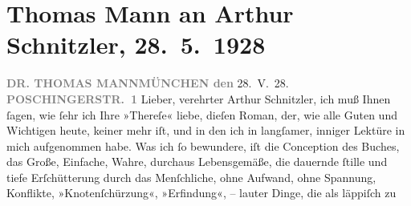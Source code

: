 

         \renewcommand{\erwaehnteOrte}{Orte: München, Poschingerstraße, Wien}
         \renewcommand{\erwaehnteWerke}{Werke: Therese. Chronik eines Frauenlebens}
               \section[Thomas Mann an Arthur Schnitzler, 28. 5. 1928]{ Thomas Mann an Arthur Schnitzler, 28. 5. 1928}\nopagebreak{}\rehead{ }\begin{ledgroupsized}[t]{13cm}\normalsize\beginnumbering \toendnotes[C]{\smallbreak\pagebreak[2]} 
\toendnotes[C]{\smallbreak}\pstart
           \noindent{}{\pb}\textcolor{gray}{\textbf{DR. THOMAS MANN}}\hfill \textcolor{gray}{\textbf{MÜNCHEN den}}{ }28. V. 28.\pend
           \pstart
           \raggedleft{}\textcolor{gray}{\textbf{POSCHINGERSTR. 1}}\pend
           \pstart{}Lieber, verehrter Arthur Schnitzler,\pend\pstart
           ich muß Ihnen ſagen, wie ſehr ich Ihre »Thereſe«
               liebe, dieſen Roman, der, wie alle Guten und Wichtigen heute, keiner mehr iſt, und in
               den ich in langſamer, inniger Lektüre in mich aufgenommen habe. Was ich ſo bewundere,
               iſt die Conception des Buches, das Große, Einfache, Wahre, durchaus Lebensgemäße, die
               dauernde ſtille und tiefe Erſchütterung durch das {\pb}Menſchliche, ohne Aufwand, ohne Spannung,
               Konflikte, »Knotenſchürzung«, »Erfindung«, – lauter Dinge, die als läppiſch zu

\end{ledgroupsized}
